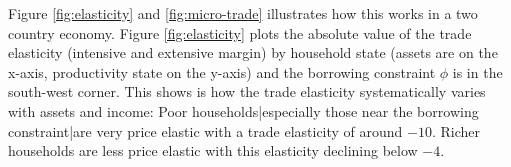 \documentclass[12pt,pdftex]{article}
\begin{document}
\begin{onehalfspacing}

Figure \ref{fig:elasticity} and \ref{fig:micro-trade} illustrates how this works in a two country economy. Figure \ref{fig:elasticity} plots the absolute value of the trade elasticity (intensive and extensive margin) by household state (assets are on the x-axis, productivity state on the y-axis) and the borrowing constraint $\phi$ is in the south-west corner. This shows is how the trade elasticity systematically varies with assets and income: Poor households|especially those near the borrowing constraint|are very price elastic with a trade elasticity of around $-10$. Richer households are less price elastic with this elasticity declining below $-4.$


\end{onehalfspacing}
\end{document}
